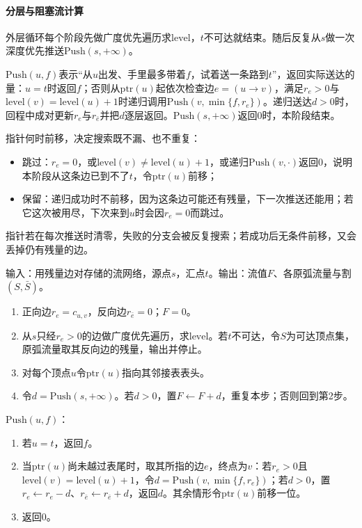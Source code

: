 \paragraph{分层与阻塞流计算}
外层循环每个阶段先做广度优先遍历求$\mathrm{level}$，$t$不可达就结束。随后反复从$s$做一次深度优先推送$\mathrm{Push}(s,+\infty)$。

$\mathrm{Push}(u,f)$表示“从$u$出发、手里最多带着$f$，试着送一条路到$t$”，返回实际送达的量：$u=t$时返回$f$；否则从$\mathrm{ptr}(u)$起依次检查边$e=(u\to v)$，满足$r_e>0$与$\mathrm{level}(v)=\mathrm{level}(u)+1$时递归调用$\mathrm{Push}(v,\min\{f,r_e\})$。递归送达$d>0$时，回程中成对更新$r_e$与$r_{\bar e}$并把$d$逐层返回。$\mathrm{Push}(s,+\infty)$返回$0$时，本阶段结束。

指针何时前移，决定搜索既不漏、也不重复：
\begin{itemize}
  \item 跳过：$r_e=0$，或$\mathrm{level}(v)\neq\mathrm{level}(u)+1$，或递归$\mathrm{Push}(v,\cdot)$返回$0$，说明本阶段从这条边已到不了$t$，令$\mathrm{ptr}(u)$前移；
  \item 保留：递归成功时不前移，因为这条边可能还有残量，下一次推送还能用；若它这次被用尽，下次来到$u$时会因$r_e=0$而跳过。
\end{itemize}
指针若在每次推送时清零，失败的分支会被反复搜索；若成功后无条件前移，又会丢掉仍有残量的边。

\begin{algorithm}[Dinic算法]
\label{alg:graph-opt-dinic}
输入：用残量边对存储的流网络，源点$s$，汇点$t$。输出：流值$F$、各原弧流量与割$(S,\bar S)$。
\begin{enumerate}
  \item 正向边$r_e=c_{u,v}$，反向边$r_{\bar e}=0$；$F=0$。
  \item 从$s$只经$r_e>0$的边做广度优先遍历，求$\mathrm{level}$。若$t$不可达，令$S$为可达顶点集，原弧流量取其反向边的残量，输出并停止。
  \item 对每个顶点$u$令$\mathrm{ptr}(u)$指向其邻接表表头。
  \item 令$d=\mathrm{Push}(s,+\infty)$。若$d>0$，置$F\gets F+d$，重复本步；否则回到第2步。
\end{enumerate}
$\mathrm{Push}(u,f)$：
\begin{enumerate}
  \item 若$u=t$，返回$f$。
  \item 当$\mathrm{ptr}(u)$尚未越过表尾时，取其所指的边$e$，终点为$v$：若$r_e>0$且$\mathrm{level}(v)=\mathrm{level}(u)+1$，令$d=\mathrm{Push}(v,\min\{f,r_e\})$；若$d>0$，置$r_e\gets r_e-d$、$r_{\bar e}\gets r_{\bar e}+d$，返回$d$。其余情形令$\mathrm{ptr}(u)$前移一位。
  \item 返回$0$。
\end{enumerate}
\end{algorithm}

